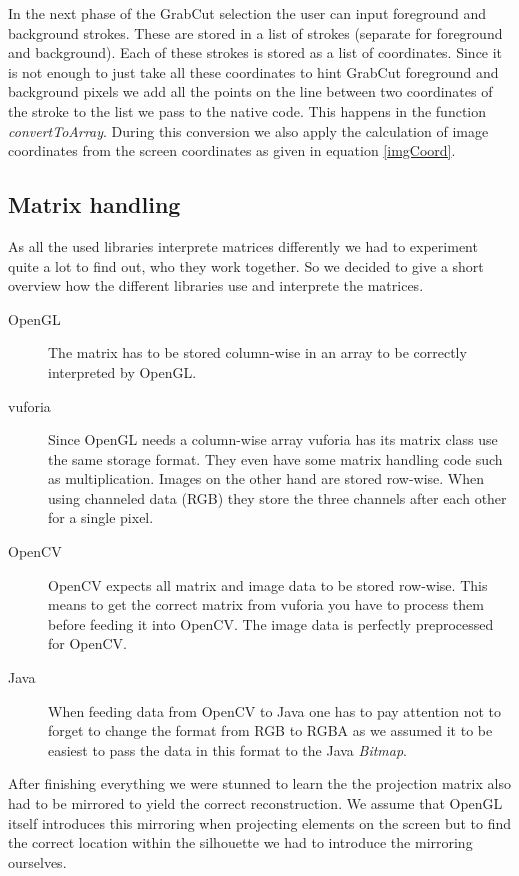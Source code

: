 \documentclass[10pt,twocolumn,letterpaper]{article}
\begin{document}
In the next phase of the GrabCut selection the user can input foreground and background strokes. These are stored in a list of strokes (separate for foreground and background). Each of these strokes is stored as a list of coordinates. Since it is not enough to just take all these coordinates to hint GrabCut foreground and background pixels we add all the points on the line between two coordinates of the stroke to the list we pass to the native code. This happens in the function \emph{convertToArray}. During this conversion we also apply the calculation of image coordinates from the screen coordinates as given in equation \ref{imgCoord}.

\subsection{Matrix handling}

As all the used libraries interprete matrices differently we had to experiment quite a lot to find out, who they work together. So we decided to give a short overview how the different libraries use and interprete the matrices.

\begin{description}
	\item[OpenGL] The matrix has to be stored column-wise in an array to be correctly interpreted by OpenGL.
	\item[vuforia] Since OpenGL needs a column-wise array vuforia has its matrix class use the same storage format. They even have some matrix handling code such as multiplication. Images on the other hand are stored row-wise. When using channeled data (RGB) they store the three channels after each other for a single pixel.
	\item[OpenCV] OpenCV expects all matrix and image data to be stored row-wise. This means to get the correct matrix from vuforia you have to process them before feeding it into OpenCV. The image data is perfectly preprocessed for OpenCV.
	\item[Java] When feeding data from OpenCV to Java one has to pay attention not to forget to change the format from RGB to RGBA as we assumed it to be easiest to pass the data in this format to the Java \emph{Bitmap}.
\end{description}

After finishing everything we were stunned to learn the the projection matrix also had to be mirrored to yield the correct reconstruction. We assume that OpenGL itself introduces this mirroring when projecting elements on the screen but to find the correct location within the silhouette we had to introduce the mirroring ourselves.
\end{document}
